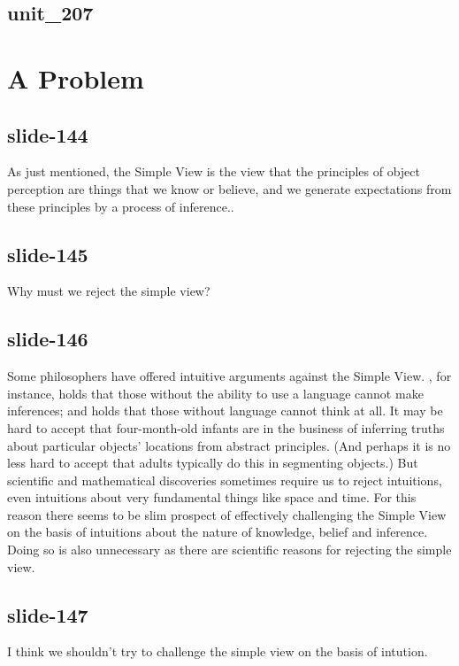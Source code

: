 \documentclass[12pt,\papersize]{extarticle}
\begin{document}
\subsection{unit\_207}
 
 
\section{A Problem}
 
\subsection{slide-144}
As just mentioned, the Simple View is the view that the principles of object perception are things that we know or believe, and we generate expectations from these principles by a process of inference..
 
\subsection{slide-145}
Why must we reject the simple view?
 
\subsection{slide-146}
Some philosophers have offered intuitive arguments against the Simple View.
\citet{Bermudez:2003dj}, for instance, holds that those without the
ability to use a language cannot make inferences;
and \citet{Davidson:1975eq} holds that those without language cannot
think at all.
It may be hard to accept that four-month-old infants are in the business
of inferring truths about particular objects’ locations from abstract
principles.
(And perhaps it is no less hard to accept that adults typically do this
in segmenting objects.)
But scientific and mathematical discoveries sometimes require us to
reject intuitions, even intuitions about very fundamental things like
space and time.
For this reason there seems to be slim prospect of effectively
challenging the Simple View on the basis of intuitions about the nature
of knowledge, belief and inference.
Doing so is also unnecessary as there are scientific reasons for
rejecting the simple view.
 
\subsection{slide-147}
I think we shouldn't try to challenge the simple view on the basis of intution.
 
\end{document}
